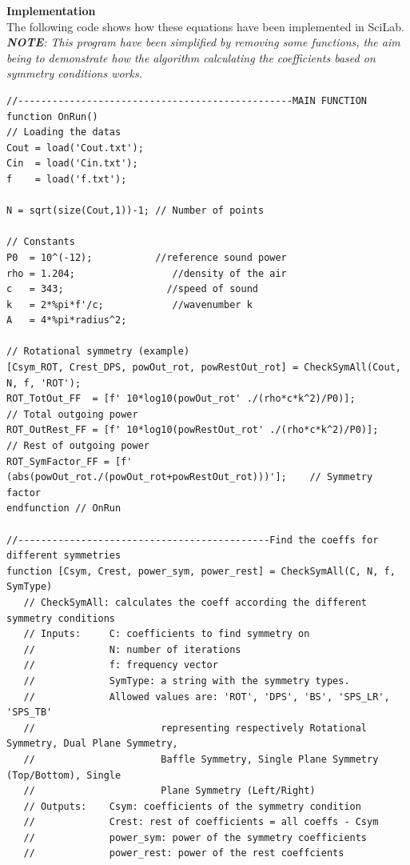 \documentclass{report}
\begin{document}
\begin{appendices}
\newpage

\textbf{Implementation} \\

The following code shows how these equations have been implemented in SciLab.\\
\textit{\textbf{NOTE}: This program have been simplified by removing some functions, the aim being to demonstrate how the algorithm calculating the coefficients based on symmetry conditions works.}

\lstset{language=SCilab} 
\begin{lstlisting}
//------------------------------------------------MAIN FUNCTION
function OnRun()
// Loading the datas
Cout = load('Cout.txt');
Cin  = load('Cin.txt');
f    = load('f.txt');

N = sqrt(size(Cout,1))-1; // Number of points

// Constants 
P0  = 10^(-12);		      //reference sound power
rho = 1.204;		         //density of the air
c   = 343;		            //speed of sound
k   = 2*%pi*f'/c;	         //wavenumber k
A   = 4*%pi*radius^2; 

// Rotational symmetry (example)
[Csym_ROT, Crest_DPS, powOut_rot, powRestOut_rot] = CheckSymAll(Cout, N, f, 'ROT');
ROT_TotOut_FF  = [f' 10*log10(powOut_rot' ./(rho*c*k^2)/P0)];        // Total outgoing power 
ROT_OutRest_FF = [f' 10*log10(powRestOut_rot' ./(rho*c*k^2)/P0)];    // Rest of outgoing power
ROT_SymFactor_FF = [f' (abs(powOut_rot./(powOut_rot+powRestOut_rot)))'];    // Symmetry factor
endfunction // OnRun

//--------------------------------------------Find the coeffs for different symmetries
function [Csym, Crest, power_sym, power_rest] = CheckSymAll(C, N, f, SymType)
   // CheckSymAll: calculates the coeff according the different symmetry conditions
   // Inputs:     C: coefficients to find symmetry on 
   //             N: number of iterations 
   //             f: frequency vector
   //             SymType: a string with the symmetry types. 
   //	          Allowed values are: 'ROT', 'DPS', 'BS', 'SPS_LR', 'SPS_TB' 
   //                      representing respectively Rotational Symmetry, Dual Plane Symmetry, 
   //                      Baffle Symmetry, Single Plane Symmetry (Top/Bottom), Single 
   //                      Plane Symmetry (Left/Right)
   // Outputs:    Csym: coefficients of the symmetry condition
   //             Crest: rest of coefficients = all coeffs - Csym
   //             power_sym: power of the symmetry coefficients
   //             power_rest: power of the rest coeffcients   
   

\end{lstlisting}
\end{appendices}
\end{document}
